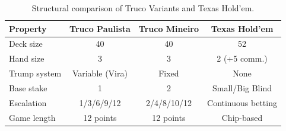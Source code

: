 \begin{table}[h]
\centering
\caption{Structural comparison of Truco Variants and Texas Hold'em.}
\label{tab:truco-vs-poker}
\begin{tabular}{lccc}
\toprule
\textbf{Property} & \textbf{Truco Paulista} & \textbf{Truco Mineiro} & \textbf{Texas Hold'em} \\
\midrule
Deck size & 40 & 40 & 52 \\
Hand size & 3 & 3 & 2 (+5 comm.) \\
Trump system & Variable (Vira) & Fixed & None \\
Base stake & 1 & 2 & Small/Big Blind \\
Escalation & 1/3/6/9/12 & 2/4/8/10/12 & Continuous betting \\
Game length & 12 points & 12 points & Chip-based \\
\bottomrule
\end{tabular}
\end{table}

